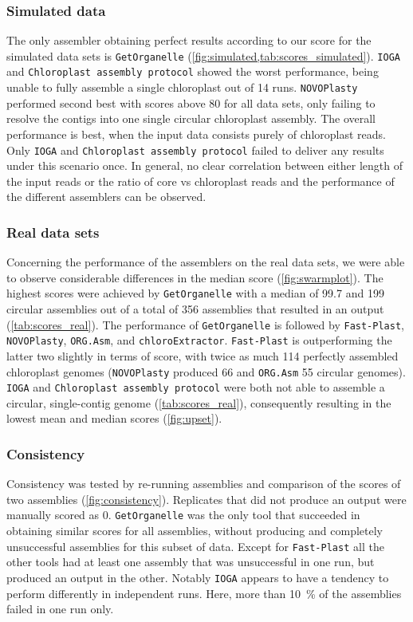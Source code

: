 \documentclass{bmcart}
\newcounter{todocounter}
\newcommand{\ak}[1]
{\stepcounter{todocounter}
 \todo[color=green!40,author=Arthur]{\thetodocounter: #1}
 }
\newcommand{\formatprogramnames}[1]{\texttt{#1}}
\newcommand{\ce}{\formatprogramnames{chloroExtractor}}
\newcommand{\oa}{\formatprogramnames{ORG.Asm}}
\newcommand{\fp}{\formatprogramnames{Fast-Plast}}
\newcommand{\ioga}{\formatprogramnames{IOGA}}
\newcommand{\np}{\formatprogramnames{NOVOPlasty}}
\newcommand{\go}{\formatprogramnames{GetOrganelle}}
\newcommand{\cassp}{\formatprogramnames{Chloroplast assembly protocol}}
\begin{document}
\subsubsection*{Simulated data}
The only assembler obtaining perfect results according to our score for the simulated data sets is \go{} (\cref{fig:simulated,tab:scores_simulated}).
\ioga{} and \cassp{} showed the worst performance, being unable to fully assemble a single chloroplast out of \num{14} runs.
\np{} performed second best with scores above \num{80} for all data sets, only failing to resolve the contigs into one single circular chloroplast assembly.
The overall performance is best, when the input data consists purely of chloroplast reads.
Only \ioga{} and \cassp{} failed to deliver any results under this scenario once.
In general, no clear correlation between either length of the input reads or the ratio of core vs chloroplast reads and the performance of the different assemblers can be observed. 

\subsubsection*{Real data sets}
Concerning the performance of the assemblers on the real data sets, we were able to observe considerable differences in the median score (\cref{fig:swarmplot}).
The highest scores were achieved by \go{} with a median of \num{99.7} and \num{199} circular assemblies out of a total of 356 assemblies that resulted in an output (\cref{tab:scores_real}).
The performance of \go{} is followed by \fp{}, \np{}, \oa{}, and \ce{}. \fp{} is outperforming the latter two slightly in terms of score, with twice as much \num{114} perfectly assembled chloroplast genomes (\np{} produced \num{66} and \oa{} \num{55} circular genomes).
\ioga{} and \cassp{} were both not able to assemble a circular, single-contig genome (\cref{tab:scores_real}), consequently resulting in the lowest mean and median scores (\cref{fig:upset}).

\subsubsection*{Consistency}
Consistency was tested by re-running assemblies and comparison of the scores of two assemblies (\cref{fig:consistency}).
Replicates that did not produce an output were manually scored as \num{0}. 
\go{} was the only tool that succeeded in obtaining similar scores for all assemblies, without producing and completely unsuccessful assemblies for this subset of data.
Except for \fp{} all the other tools had at least one assembly that was unsuccessful in one run, but produced an output in the other.
Notably \ioga{} appears to have a tendency to perform differently in independent runs.
Here, more than \SI{10}{\percent} of the assemblies failed in one run only.
\end{document}
